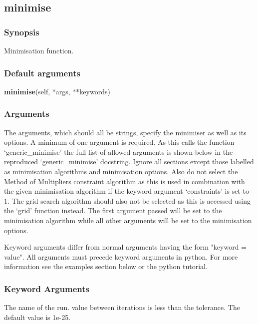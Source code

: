 


\newpage

\subsection{minimise}


\subsubsection{Synopsis}

Minimisation function.

\subsubsection{Default arguments}

\textsf{\textbf{minimise}(self, *args, **keywords)}


\subsubsection{Arguments}

The arguments, which should all be strings, specify the minimiser as well as its options.  A
minimum of one argument is required.  As this calls the function `generic\_minimise' the full
list of allowed arguments is shown below in the reproduced `generic\_minimise' docstring.
Ignore all sections except those labelled as minimisation algorithms and minimisation
options.  Also do not select the Method of Multipliers constraint algorithm as this is used
in combination with the given minimisation algorithm if the keyword argument `constraints'
is set to 1.  The grid search algorithm should also not be selected as this is accessed
using the `grid' function instead.  The first argument passed will be set to the
minimisation algorithm while all other arguments will be set to the minimisation options.

Keyword arguments differ from normal arguments having the form "keyword = value".  All
arguments must precede keyword arguments in python.  For more information see the examples
section below or the python tutorial.


\subsubsection{Keyword Arguments}

  The name of the run.
value between iterations is less than the tolerance.  The default value is 1e-25.

